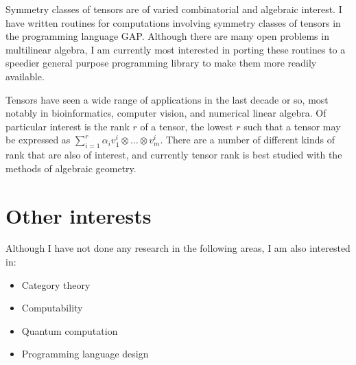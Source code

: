 \documentclass[11pt]{article}
\begin{document}
Symmetry classes of tensors are of varied combinatorial and algebraic
interest. I have written routines for computations involving symmetry classes of
tensors in the programming language GAP. Although there are many open problems
in multilinear algebra, I am currently most interested in porting these routines
to a speedier general purpose programming library to make them more readily
available.

Tensors have seen a wide range of applications in the last decade or so, most
notably in bioinformatics, computer vision, and numerical linear algebra. Of
particular interest is the rank $r$ of a tensor, the lowest $r$ such that a
tensor may be expressed as \( \sum_{i=1}^r\alpha_i v_1^i \otimes \dots \otimes
v_m^i \). There are a number of different kinds of rank that are also of
interest, and currently tensor rank is best studied with the methods of
algebraic geometry.

\section{Other interests}

Although I have not done any research in the following areas, I am also
interested in:

\begin{itemize}
\item Category theory
\item Computability
\item Quantum computation
\item Programming language design
\end{itemize}

\printbibliography
\end{document}
